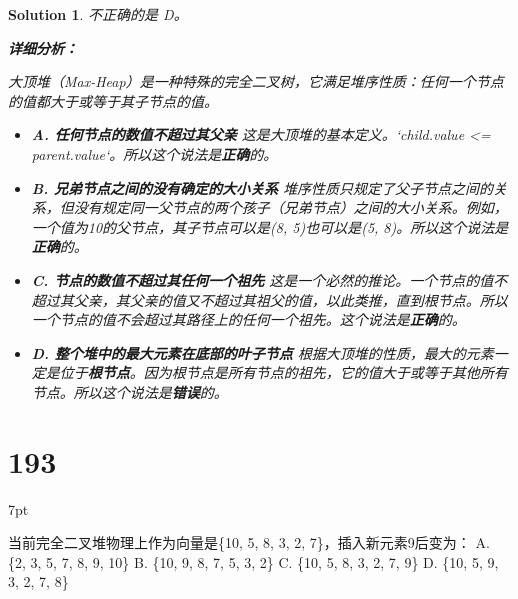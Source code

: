 \documentclass[UTF8]{report}
\newtheorem{solution}{Solution}
\theoremstyle{MyLineTheoremStyle} %
\theoremstyle{MyBlockTheoremStyle} %
\theoremstyle{MySubsubsectionStyle} %
\newenvironment{graybox}{%
        \def\FrameCommand{%
        \hspace{1pt}%
        {\color{gray}\small \vrule width 2pt}%
        {\color{graybox_color}\vrule width 4pt}%
        \colorbox{graybox_color}%
        }%
        \MakeFramed{\advance\hsize-\width\FrameRestore}%
        \noindent\hspace{-4.55pt}%
        \begin{adjustwidth}{}{7pt}%
        \vspace{2pt}\vspace{2pt}%
        }
        {%
        \vspace{2pt}\end{adjustwidth}\endMakeFramed%
        }
\begin{document}
\begin{solution}
不正确的是 D。

\textbf{详细分析：}

大顶堆（Max-Heap）是一种特殊的完全二叉树，它满足堆序性质：任何一个节点的值都大于或等于其子节点的值。

\begin{itemize}
    \item \textbf{A. 任何节点的数值不超过其父亲}
    这是大顶堆的基本定义。`child.value <= parent.value`。所以这个说法是\textbf{正确}的。

    \item \textbf{B. 兄弟节点之间的没有确定的大小关系}
    堆序性质只规定了父子节点之间的关系，但没有规定同一父节点的两个孩子（兄弟节点）之间的大小关系。例如，一个值为10的父节点，其子节点可以是(8, 5)也可以是(5, 8)。所以这个说法是\textbf{正确}的。

    \item \textbf{C. 节点的数值不超过其任何一个祖先}
    这是一个必然的推论。一个节点的值不超过其父亲，其父亲的值又不超过其祖父的值，以此类推，直到根节点。所以一个节点的值不会超过其路径上的任何一个祖先。这个说法是\textbf{正确}的。

    \item \textbf{D. 整个堆中的最大元素在底部的叶子节点}
    根据大顶堆的性质，最大的元素一定是位于\textbf{根节点}。因为根节点是所有节点的祖先，它的值大于或等于其他所有节点。所以这个说法是\textbf{错误}的。
\end{itemize}
\end{solution}

\section*{193}
\begin{graybox}
当前完全二叉堆物理上作为向量是\{10, 5,
8, 3, 2, 7\}，插入新元素9后变为：
A. \{2, 3, 5, 7, 8, 9, 10\}
B. \{10, 9, 8, 7, 5, 3, 2\}
C. \{10, 5, 8, 3, 2, 7, 9\}
D. \{10, 5, 9, 3, 2, 7, 8\}
\end{graybox}
\end{document}
